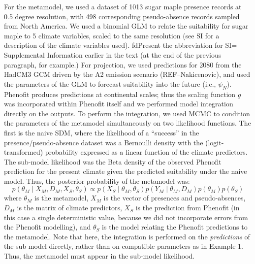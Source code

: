 For the metamodel, we used a dataset of 1013 sugar maple presence records at 0.5 degree resolution, with 498 corresponding pseudo-absence records sampled from North America.
We used a binomial GLM to relate the suitability for sugar maple to 5 climate variables, scaled to the same resolution (see SI for a description of the climate variables used).
fd{Present the abbreviation for SI= Supplemental Information earlier in the text (at the end of the previous paragraph, for example.)}
For projection, we used predictions for 2080 from the HadCM3 GCM \citep{Pope2000} driven by the A2 emission scenario (REF--Nakicenovic), and used the parameters of the GLM to forecast suitability into the future (i.e., \(\psi_N\)).
Phenofit produces predictions at continental scales; thus the scaling function \(g\) was incorporated within Phenofit itself and we performed model integration directly on the outputs.
To perform the integration, we used \ac{MCMC} to condition the parameters of the metamodel simultaneously on two likelihood functions.
The first is the naive SDM, where the likelihood of a ``success'' in the presence/pseudo-absence dataset was a Bernoulli density with the (logit-transformed) probability expressed as a linear function of the climate predictors.
The sub-model likelihood was the Beta density of the observed Phenofit prediction for the present climate given the predicted suitability under the naive model. 
Thus, the posterior probability of the metamodel was:
\begin{equation}
\label{eq:integrated2}
	p( \theta_M \mid X_M, D_M, X_S, \theta_S )
	\propto 
	p( X_S \mid \theta_M, \theta_S )
	p( Y_M \mid \theta_M, D_M ) 
	p( \theta_M )
	p( \theta_S )
\end{equation}
where \(\theta_M\) is the metamodel, 
\(X_M\) is the vector of presences and pseudo-absences, 
\(D_M\) is the matrix of climate predictors,
\(X_S\) is the prediction from Phenofit (in this case a single deterministic value, because we did not incorporate errors from the Phenofit modelling),
and \(\theta_S\) is the model relating the Phenofit predictions to the metamodel.
Note that here, the integration is performed on the \emph{predictions} of the sub-model directly, rather than on compatible parameters as in Example 1. Thus, the metamodel must appear in the sub-model likelihood.


